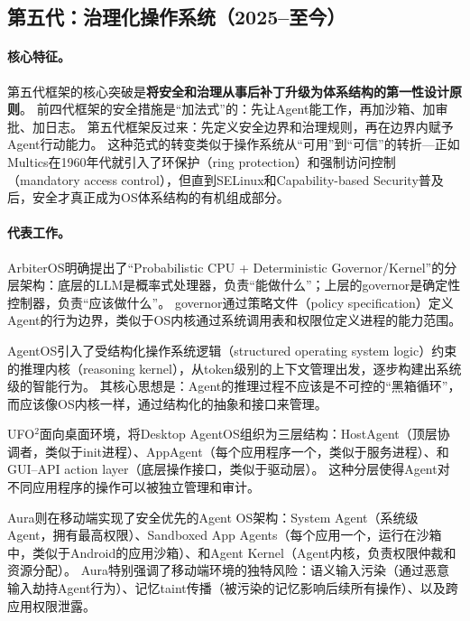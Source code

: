 \subsection{第五代：治理化操作系统（2025--至今）}

\paragraph{核心特征。}
第五代框架的核心突破是\textbf{将安全和治理从事后补丁升级为体系结构的第一性设计原则}。
前四代框架的安全措施是``加法式''的：先让Agent能工作，再加沙箱、加审批、加日志。
第五代框架反过来：先定义安全边界和治理规则，再在边界内赋予Agent行动能力。
这种范式的转变类似于操作系统从``可用''到``可信''的转折---正如Multics在1960年代就引入了环保护（ring protection）和强制访问控制（mandatory access control），但直到SELinux和Capability-based Security普及后，安全才真正成为OS体系结构的有机组成部分\cite{ostep_2023}。

\paragraph{代表工作。}
ArbiterOS\cite{arbiteros2025}明确提出了``Probabilistic CPU + Deterministic Governor/Kernel''的分层架构：底层的LLM是概率式处理器，负责``能做什么''；上层的governor是确定性控制器，负责``应该做什么''。
governor通过策略文件（policy specification）定义Agent的行为边界，类似于OS内核通过系统调用表和权限位定义进程的能力范围。

AgentOS\cite{agentos2025}引入了受结构化操作系统逻辑（structured operating system logic）约束的推理内核（reasoning kernel），从token级别的上下文管理出发，逐步构建出系统级的智能行为。
其核心思想是：Agent的推理过程不应该是不可控的``黑箱循环''，而应该像OS内核一样，通过结构化的抽象和接口来管理。

UFO$^2$\cite{ufo2_2025}面向桌面环境，将Desktop AgentOS组织为三层结构：HostAgent（顶层协调者，类似于init进程）、AppAgent（每个应用程序一个，类似于服务进程）、和GUI--API action layer（底层操作接口，类似于驱动层）。
这种分层使得Agent对不同应用程序的操作可以被独立管理和审计。

Aura\cite{aura2025}则在移动端实现了安全优先的Agent OS架构：System Agent（系统级Agent，拥有最高权限）、Sandboxed App Agents（每个应用一个，运行在沙箱中，类似于Android的应用沙箱）、和Agent Kernel（Agent内核，负责权限仲裁和资源分配）。
Aura特别强调了移动端环境的独特风险：语义输入污染（通过恶意输入劫持Agent行为）、记忆taint传播（被污染的记忆影响后续所有操作）、以及跨应用权限泄露。

